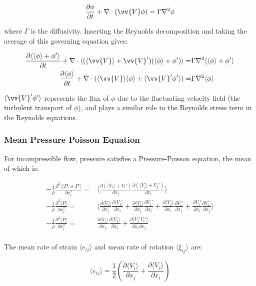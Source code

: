 \documentclass[10pt]{article}
\newcommand{\beq}{\begin{equation}}
\newcommand{\eeq}{\end{equation}}
\newcommand{\beqa}{\begin{equation}\begin{aligned}}
\newcommand{\eeqa}{\end{aligned}\end{equation}}
\newcommand{\la}{\langle}
\newcommand{\ra}{\rangle}
\begin{document}
\begin{flushleft}
\beq
\frac{\partial\phi}{\partial t}+\nabla\cdot(\vv{V}\phi)=\Gamma\nabla^2\phi
\eeq

where \(\Gamma\) is the diffusivity. Inserting the Reynolds decomposition and taking the average of this governing equation gives:

\beqa
\frac{\partial\la\la\phi\ra+\phi'\ra}{\partial t}+\nabla\cdot\la(\la\vv{V}\ra+\vv{V}')(\la\phi\ra+\phi')\ra=&\Gamma\nabla^2\la\la\phi\ra+\phi'\ra\\
\frac{\partial\la\phi\ra}{\partial t}+\nabla\cdot(\la\vv{V}\ra\la\phi\ra+\la\vv{V}'\phi'\ra)=&\Gamma\nabla^2\la\phi\ra\\
\eeqa

\(\la\vv{V}'\phi'\ra\) represents the flux of \(\phi\) due to the fluctuating velocity field (the turbulent transport of \(\phi\)), and plays a similar role to the Reynolds stress term in the Reynolds equations. 







\subsubsection{Mean Pressure Poisson Equation}
For incompressible flow, pressure satisfies a Pressure-Poisson equation, the mean of which is:

\beqa
-\frac{1}{\rho}\frac{\partial^2 \la\la P\ra + P'\ra}{\partial x_i^2}=&\la\frac{\partial(\la V_i\ra+V_i')}{\partial x_j}\frac{\partial(\la V_j\ra+V_j')}{\partial x_i}\ra\\
-\frac{1}{\rho}\frac{\partial^2 \la P\ra}{\partial x_i^2}=&\la\frac{\partial\la V_i\ra}{\partial x_j}\frac{\partial\la V_j\ra}{\partial x_i}+\frac{\partial \la V_i\ra}{\partial x_j}\frac{\partial V_j'}{\partial x_i}+\frac{\partial \la V_j\ra}{\partial x_i}\frac{\partial V_i'}{\partial x_j}+\frac{\partial V_j'}{\partial x_i}\frac{\partial V_i'}{\partial x_j}\ra\\
-\frac{1}{\rho}\frac{\partial^2\la P\ra}{\partial x_i^2}=&\frac{\partial\la V_i\ra}{\partial x_j}\frac{\partial\la V_j\ra}{\partial x_i}+\frac{\partial \la V_j'V_i'\ra}{\partial x_i\partial x_j}\\
\eeqa

The mean rate of strain \(\la e_{ij}\ra\) and mean rate of rotation \(\la\xi_{ij}\ra\) are:

\beq
\la e_{ij}\ra=\frac{1}{2}\left(\frac{\partial\la V_i\ra}{\partial x_j}+\frac{\partial\la V_j\ra}{\partial x_i}\right)
\eeq 


\end{flushleft}
\end{document}
